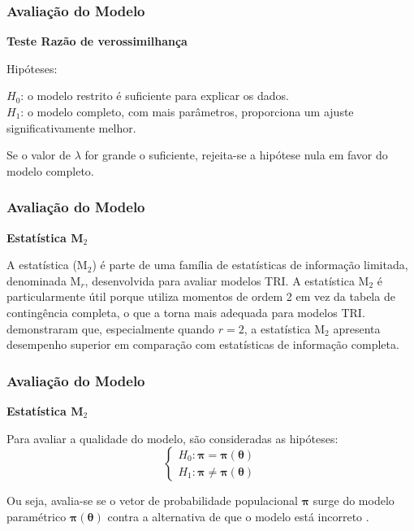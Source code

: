 \documentclass{beamer}
\begin{document}
\begin{frame}
	
	\frametitle{Avaliação do Modelo}

	\begin{center}
		\textbf{Teste Razão de verossimilhança} 
		\hfill
	\end{center}
	
	Hipóteses:\\
	\hfill 

	$H_0$: o modelo restrito é suficiente para explicar os dados.\\
	$H_1$: o modelo completo, com mais parâmetros, proporciona um ajuste significativamente melhor.\\
	\hfill
	
	Se o valor de $\lambda$ for grande o suficiente, rejeita-se a hipótese nula em favor do modelo completo. 
	
\end{frame}
	
\begin{frame}
		
		\frametitle{Avaliação do Modelo}
		
		\begin{center}
			\textbf{Estatística M$_2$} 
			\hfill
		\end{center}
		
	A estatística (M$_2$) é parte de uma família de estatísticas de informação limitada, denominada M$_r$, desenvolvida para avaliar modelos TRI.
	A estatística M$_2$ é particularmente útil porque utiliza momentos de ordem 2 em vez da tabela de contingência completa, o que a torna mais adequada para modelos TRI.
	\cite{maydeu2006limited} demonstraram que, especialmente quando $r=2$, a estatística M$_2$ apresenta desempenho superior em comparação com estatísticas de informação completa. 
		
\end{frame}		

\begin{frame}
	
	\frametitle{Avaliação do Modelo}
	
	\begin{center}
		\textbf{Estatística M$_2$} 
		\hfill
	\end{center}
	
		Para avaliar a qualidade do modelo, são consideradas as hipóteses:
		\[
		\begin{cases}
			H_0: \boldsymbol{\pi} = \boldsymbol{\pi}(\boldsymbol{\theta}) \\
			
			H_1: \boldsymbol{\pi} \neq \boldsymbol{\pi}(\boldsymbol{\theta})
		\end{cases}
		\]

	Ou seja, avalia-se se o vetor de probabilidade populacional $\boldsymbol{\pi}$ surge do modelo paramétrico $\boldsymbol{\pi}(\boldsymbol{\theta})$ contra a alternativa de que o modelo está incorreto \cite{maydeu2006limited}.
	
\end{frame}	
\end{document}
